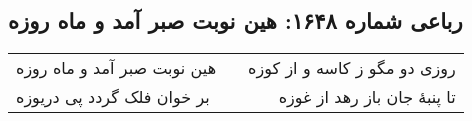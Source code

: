 \begin{center}
\section*{رباعی شماره ۱۶۴۸: هین نوبت صبر آمد و ماه روزه}
\label{sec:1648}
\begin{longtable}{l p{0.5cm} r}
هین نوبت صبر آمد و ماه روزه
&&
روزی دو مگو ز کاسه و از کوزه
\\
بر خوان فلک گردد پی دریوزه
&&
تا پنبهٔ جان باز رهد از غوزه
\\
\end{longtable}
\end{center}
